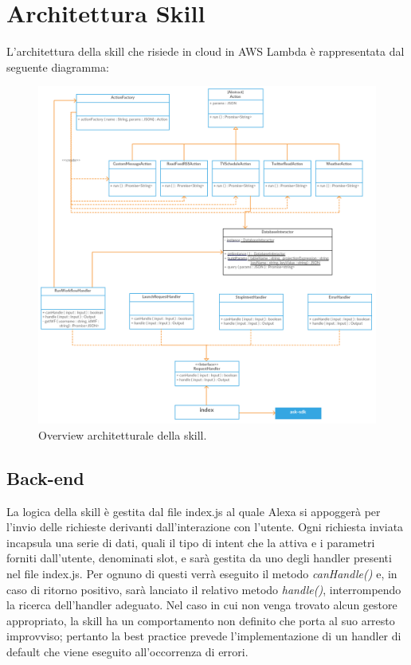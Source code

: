 \clearpage
\section{Architettura Skill}

L'architettura della skill che risiede in cloud in AWS Lambda è rappresentata dal seguente diagramma:

\begin{figure}[H]
	\begin{center}
		\includegraphics[width=\textwidth, keepaspectratio]{../includes/pics/Skill.png}
		\caption{Overview architetturale della skill.}
	\end{center}
\end{figure}

\subsection{Back-end}
La logica della skill è gestita dal file index.js al quale Alexa si appoggerà per l'invio delle richieste derivanti dall'interazione con l'utente.
Ogni richiesta inviata incapsula una serie di dati, quali il tipo di intent che la attiva e i parametri forniti dall'utente, denominati slot, e sarà gestita da uno degli handler presenti nel file index.js.
Per ognuno di questi verrà eseguito il metodo \textit{canHandle()} e, in caso di ritorno positivo, sarà lanciato il relativo metodo \textit{handle()}, interrompendo la ricerca dell'handler adeguato.
Nel caso in cui non venga trovato alcun gestore appropriato, la skill ha un comportamento non definito che porta al suo arresto improvviso; pertanto la best practice prevede l'implementazione di un handler di default che viene eseguito all'occorrenza di errori.

